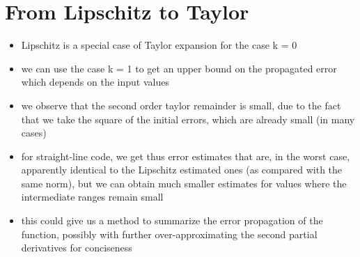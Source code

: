 \section{From Lipschitz to Taylor}

\begin{itemize}
\item Lipschitz is a special case of Taylor expansion for the case k = 0
\item we can use the case k = 1 to get an upper bound on the propagated error
which depends on the input values
\item we observe that the second order taylor remainder is small, due to the fact
that we take the square of the initial errors, which are already small (in many cases)
\item for straight-line code, we get thus error estimates that are, in the worst case,
apparently identical to the Lipschitz estimated ones (as compared with the same norm),
but we can obtain much smaller estimates for values where the intermediate ranges remain small
\item this could give us a method to summarize the error propagation of the function,
possibly with further over-approximating the second partial derivatives for conciseness
\end{itemize}
